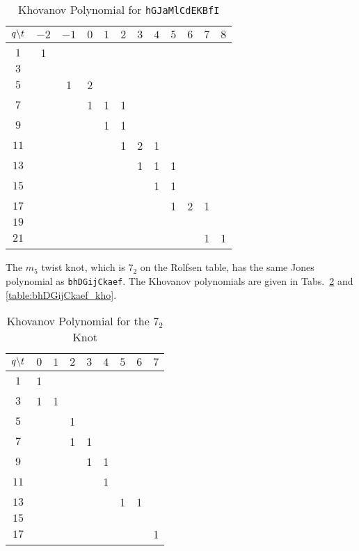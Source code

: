 \documentclass{article}
\theoremstyle{plain}
\begin{document}
        \begin{table}[H]
            \centering
            \begin{tabular}{| c | c | c | c | c | c | c | c | c | c | c | c |}
                \hline
                $q\symbol{92}t$&$-2$&$-1$&$0$&$1$&$2$&$3$&$4$&$5$&$6$&$7$&$8$\\
                \hline
                $1$&1&&&&&&&&&&\\
                \hline
                $3$&&&&&&&&&&&\\
                \hline
                $5$&&1&2&&&&&&&&\\
                \hline
                $7$&&&1&1&1&&&&&&\\
                \hline
                $9$&&&&1&1&&&&&&\\
                \hline
                $11$&&&&&1&2&1&&&&\\
                \hline
                $13$&&&&&&1&1&1&&&\\
                \hline
                $15$&&&&&&&1&1&&&\\
                \hline
                $17$&&&&&&&&1&2&1&\\
                \hline
                $19$&&&&&&&&&&&\\
                \hline
                $21$&&&&&&&&&&1&1\\
                \hline
            \end{tabular}
            \caption{Khovanov Polynomial for \texttt{hGJaMlCdEKBfI}}
            \label{table:hGJaMlCdEKBfI_kho}
        \end{table}
        The $m_{5}$ twist knot, which is $7_{2}$ on the Rolfsen table, has the
        same Jones polynomial as \texttt{bhDGijCkaef}. The Khovanov polynomials
        are given in Tabs.~\ref{table:m_5_kho} and \ref{table:bhDGijCkaef_kho}.
        \begin{table}[H]
            \centering
            \begin{tabular}{| c | c | c | c | c | c | c | c | c |}
                \hline
                $q\symbol{92}t$&$0$&$1$&$2$&$3$&$4$&$5$&$6$&$7$\\
                \hline
                $1$&1&&&&&&&\\
                \hline
                $3$&1&1&&&&&&\\
                \hline
                $5$&&&1&&&&&\\
                \hline
                $7$&&&1&1&&&&\\
                \hline
                $9$&&&&1&1&&&\\
                \hline
                $11$&&&&&1&&&\\
                \hline
                $13$&&&&&&1&1&\\
                \hline
                $15$&&&&&&&&\\
                \hline
                $17$&&&&&&&&1\\
                \hline
            \end{tabular}
            \caption{Khovanov Polynomial for the $7_{2}$ Knot}
            \label{table:m_5_kho}
        \end{table}
\end{document}
